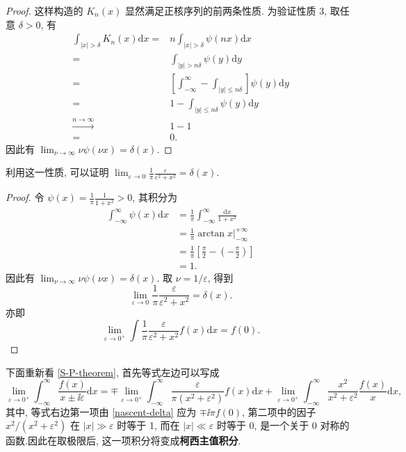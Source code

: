 \begin{proof}{}{}
    这样构造的 $K_n(x)$ 显然满足正核序列的前两条性质. 为验证性质 3, 取任意 $\delta>0$, 有
       \begin{align}
            \int_{|x|>\delta}K_n(x)\mathrm{d}x=&n\int_{|x|>\delta}\psi(nx)\mathrm{d}x\nonumber\\
            =&\int_{|y|>n\delta}\psi(y)\mathrm{d}y\nonumber\\
            =&\left[ \int_{-\infty}^\infty-\int_{|y|\le n\delta} \right] \psi(y)\mathrm{d}y\nonumber\\
            =&1-\int_{|y|\le n\delta}\psi(y)\mathrm{d}y\nonumber\\
\stackrel{n\to\infty}{\longrightarrow}&1-1\nonumber\\
=&0.
        \end{align}
    因此有 $\displaystyle{\lim_{\nu\to\infty}\nu\psi(\nu x)=\delta(x)}$.
\end{proof}
利用这一性质, 可以证明 $\displaystyle{\lim_{\varepsilon\to 0}\frac{1}{\pi}\frac{\varepsilon}{\varepsilon^2+x^2}=\delta(x)}$.
\begin{proof}{}{}
    令 $\displaystyle{\psi(x)=\frac{1}{\pi}\frac{1}{1+x^2}>0}$, 其积分为
    \begin{align}
            \int_{-\infty}^{\infty}\psi(x)\mathrm{d}x&=\frac{1}{\pi}\int_{-\infty}^\infty\frac{\mathrm{d}x}{1+x^2}\nonumber\\
            &=\frac{1}{\pi}\arctan x\Big|_{-\infty}^{+\infty}\nonumber\\
            &=\frac{1}{\pi}\left[ \frac{\pi}{2}-\left( -\frac{\pi}{2} \right) \right]\nonumber\\ 
            &=1.
        \end{align}
    因此有 $\displaystyle{\lim_{\nu\to \infty}\nu\psi(\nu x)=\delta(x)}$. 取 $\nu=1/\varepsilon$, 得到
    \begin{equation}
        \lim_{\varepsilon\to 0}\frac{1}{\pi}\frac{\varepsilon}{\varepsilon^2+x^2}=\delta(x).
    \end{equation}
    亦即
    \begin{equation}
        \lim_{\varepsilon\to 0^+}\int\frac{1}{\pi}\frac{\varepsilon}{\varepsilon^2+x^2}f(x)\mathrm{d}x=f(0).
        \label{nascent-delta}
    \end{equation}
\end{proof}
下面重新看 \eqref{S-P-theorem}, 首先等式左边可以写成
\begin{equation}
    \lim_{\varepsilon\to 0^+}\int_{-\infty}^\infty \frac{f(x)}{x\pm \ii\varepsilon}\mathrm{d}x=\mp \lim_{\varepsilon\to 0^+}\int_{-\infty}^\infty\frac{\varepsilon}{\pi(x^2+\varepsilon^2)}f(x)\mathrm{d}x+\lim_{\varepsilon\to 0^+}\int_{-\infty}^\infty \frac{x^2}{x^2+\varepsilon^2}\frac{f(x)}{x}\mathrm{d}x,
\end{equation}
其中, 等式右边第一项由 \eqref{nascent-delta} 应为 $\mp\ii\pi f(0)$, 第二项中的因子 $x^2/(x^2+\varepsilon^2)$ 在 $|x|\gg \varepsilon$ 时等于 1, 而在 $|x|\ll \varepsilon$ 时等于 0, 是一个关于 0 对称的函数.因此在取极限后, 这一项积分将变成\textbf{柯西主值积分}.

